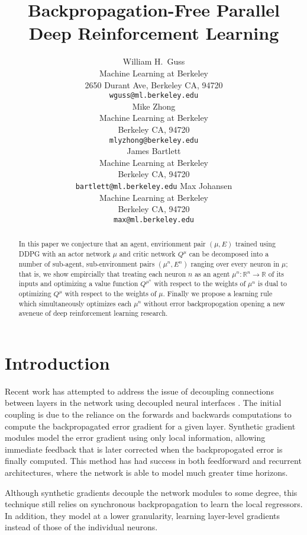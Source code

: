 \documentclass{article} %
\title{Backpropagation-Free Parallel Deep Reinforcement Learning}
\author{
William H.~Guss \\
Machine Learning at Berkeley\\
2650 Durant Ave, Berkeley CA, 94720 \\
\texttt{wguss@ml.berkeley.edu} \\
\And
Mike Zhong \\
Machine Learning at Berkeley \\
Berkeley CA, 94720 \\
\texttt{mlyzhong@berkeley.edu} \\
\And
James Bartlett\\
Machine Learning at Berkeley \\
Berkeley CA, 94720 \\
\texttt{bartlett@ml.berkeley.edu}
\And
Max Johansen \\
Machine Learning at Berkeley \\
Berkeley CA, 94720 \\
\texttt{max@ml.berkeley.edu}
}
\numberwithin{equation}{subsection}
\numberwithin{theorem}{subsection}
\theoremstyle{named}
\begin{document}
\maketitle

\begin{abstract}
    In this paper we conjecture that an agent, envirionment pair $(\mu, E)$ trained using DDPG with an actor network $\mu$ and critic network $Q^{\mu}$ can be decomposed into a number of sub-agent, sub-environment pairs  $(\mu^n, E^n)$ ranging over every neuron in $\mu$; that is, we show empircially that treating each neuron $n$ as an agent $\mu^n: \mathbb{R}^n \to \mathbb{R}$ of its inputs and optimizing a value function $Q^{\mu^n}$ with respect to the weights of $\mu^n$ is dual to optimizing $Q^\mu$ with respect to the weights of $\mu$. Finally we propose a learning rule which simultaneously optimizes each $\mu^n$ without error backpropogation opening a new aveneue of deep reinforcement learning research.
\end{abstract}
\listoftodos


\section{Introduction}


Recent work has attempted to address the issue of decoupling connections between layers in the network using decoupled neural interfaces \cite{jaderberg2016syngrad}. The initial coupling is due to the reliance on the forwards and backwards computations to compute the backpropagated error gradient for a given layer. Synthetic gradient modules model the error gradient using only local information, allowing immediate feedback that is later corrected when the backpropogated error is finally computed. This method has had success in both feedforward and recurrent architectures, where the network is able to model much greater time horizons.

Although synthetic gradients decouple the network modules to some degree, this technique still relies on synchronous backpropagation to learn the local regressors. In addition, they model at a lower granularity, learning layer-level gradients instead of those of the individual neurons.
\end{document}

